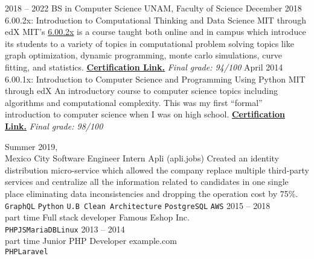 \documentclass[9pt]{developercv}
\begin{document}
\begin{entrylist}
    \entry
        {2018 -- 2022}
        {BS in Computer Science}
        {UNAM, Faculty of Science}
        {}
    \entry
        {December 2018}
        {6.00.2x: Introduction to Computational Thinking and Data Science}
        {MIT through edX}
        {MIT's {\href{https://www.edx.org/course/introduction-to-computational-thinking-and-data-science-2}{6.00.2x}} is a course taught both online and in campus which introduce its students to a variety of topics in computational problem solving topics like graph optimization, dynamic programming, monte carlo simulations, curve fitting, and statistics. {\href{https://courses.edx.org/certificates/44a472b535354c15b494ac70b98af436}{\textbf{\underline{Certification Link.}}}} \textit{\small{Final grade: 94/100}}} 
    \entry
        {April 2014}
        {6.00.1x: Introduction to Computer Science and Programming Using Python}
        {MIT through edX}
        {An introductory course to computer science topics including algorithms and computational complexity. This was my first ``formal'' introduction to computer science when I was on high school. {\href{https://verify.edx.org/cert/7392793dde3e4537911d04e6ffc0b3f5}{\textbf{\underline{Certification Link.}}}} \textit{\small{Final grade: 98/100}}} 
\end{entrylist}



\begin{entrylist}
    \entry
        {Summer 2019,\\Mexico City}
        {Software Engineer Intern}
        {Apli (apli.jobs)}
        {
            Created an identity distribution micro-service which allowed the
            company replace multiple third-party services and centralize all the
            information related to candidates in one single place eliminating data
            inconsistencies and dropping the operation cost by 75\%.\\
                \texttt{GraphQL}\slashsep
                \texttt{Python}\slashsep
                \texttt{U.B Clean Architecture}\slashsep
                \texttt{PostgreSQL}\slashsep
                \texttt{AWS}
        }
    \entry
        {2015 -- 2018\\\footnotesize{part time}}
        {Full stack developer}
        {Famous Eshop Inc.}
        {\lorem\lorem\\ \texttt{PHP}\slashsep\texttt{JS}\slashsep\texttt{MariaDB}\slashsep\texttt{Linux}}
    \entry
        {2013 -- 2014\\\footnotesize{part time}}
        {Junior PHP Developer}
        {example.com}
        {\lorem\lorem\\ \texttt{PHP}\slashsep\texttt{Laravel}}
\end{entrylist}
\end{document}
